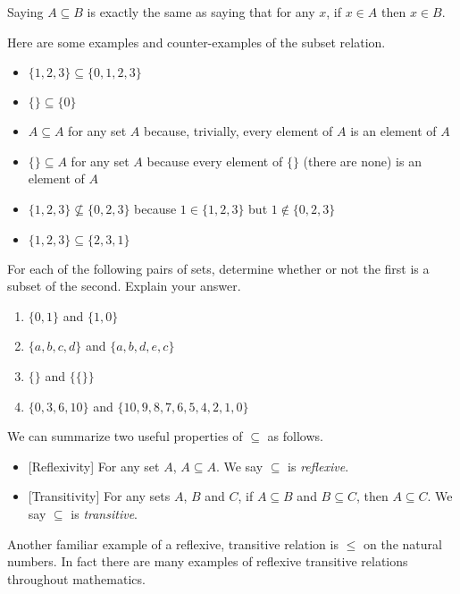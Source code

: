 Saying $A\subseteq B$ is exactly the same as saying that for any $x$, if $x\in A$ then $x\in B$.

\begin{example}
  Here are some examples and counter-examples of the subset relation.
  \begin{itemize}
  \item $\{1,2,3\}\subseteq \{0,1,2,3\}$
  \item $\{\}\subseteq \{0\}$
  \item $A\subseteq A$ for any set $A$ because, trivially, every
    element of $A$ is an element of $A$
  \item $\{\} \subseteq A$ for any set $A$ because every element of
    $\{\}$ (there are none) is an element of $A$
  \item $\{1,2,3\}\not\subseteq \{0,2,3\}$ because $1\in \{1,2,3\}$
    but $1\notin \{0,2,3\}$
  \item $\{1,2,3\}\subseteq \{2,3,1\}$
  \end{itemize}
\end{example}

\ipadbreak

\begin{exercises}
	For each of the following pairs of sets, determine whether or
  not the first is a subset of the second. Explain your answer.
  \begin{enumerate}[series=exercises]
  \item $\{0,1\}$ and $\{1,0\}$
  \item $\{a,b,c,d\}$ and $\{a,b,d,e,c\}$
  \item $\{\}$ and $\{\{\}\}$
  \item $\{0,3,6,10\}$ and $\{10,9,8,7,6,5,4,2,1, 0\}$
  \end{enumerate}
\end{exercises}


We can summarize two useful properties of $\subseteq$ as follows.
\begin{itemize}
	\item{}[Reflexivity]  For any set $A$, $A \subseteq A$. We say $\subseteq$ is \emph{reflexive}.
	\item{}[Transitivity] For any sets $A$, $B$ and $C$,
	if $A\subseteq B$ and $B\subseteq C$, then $A\subseteq C$. We say $\subseteq$ is \emph{transitive}.
\end{itemize}
Another familiar example of a reflexive, transitive
relation is $\leq$ on the natural numbers. In fact there are many examples of reflexive transitive relations throughout mathematics. 

